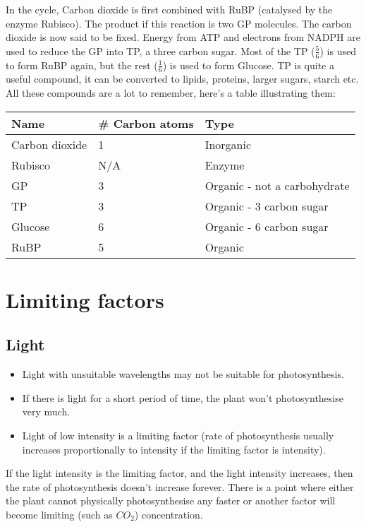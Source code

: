 \documentclass{article}
\begin{document}
In the cycle, Carbon dioxide is first combined with RuBP (catalysed by the enzyme Rubisco). The product if this reaction is two GP molecules. The carbon dioxide is now said to be fixed. Energy from ATP and electrons from NADPH are used to reduce the GP into TP, a three carbon sugar. Most of the TP ($\frac{5}{6}$) is used to form RuBP again, but the rest ($\frac{1}{6}$) is used to form Glucose. TP is quite a useful compound, it can be converted to lipids, proteins, larger sugars, starch etc.
\newpage
All these compounds are a lot to remember, here's a table illustrating them:
\begin{center}
	\begin{tabular}{|l|l|l|}
		\hline
			Name & \# Carbon atoms & Type\\ \hline
			Carbon dioxide & 1 & Inorganic\\ \hline
			Rubisco & N/A & Enzyme\\ \hline
			GP & 3 & Organic - not a carbohydrate\\ \hline
			TP & 3 & Organic - 3 carbon sugar\\ \hline
			Glucose & 6 & Organic - 6 carbon sugar\\ \hline
			RuBP & 5 & Organic\\ \hline
	\end{tabular}
\end{center}


\section*{Limiting factors}
\subsection*{Light}
\begin{itemize}
	\item Light with unsuitable wavelengths may not be suitable for photosynthesis.
	\item If there is light for a short period of time, the plant won't photosynthesise very much.
	\item Light of low intensity is a limiting factor (rate of photosynthesis usually increases proportionally to intensity if the limiting factor is intensity).
\end{itemize}
If the light intensity is the limiting factor, and the light intensity increases, then the rate of photosynthesis doesn't increase forever. There is a point where either the plant cannot physically photosynthesise any faster or another factor will become limiting (such as $CO_2$) concentration.
\end{document}
